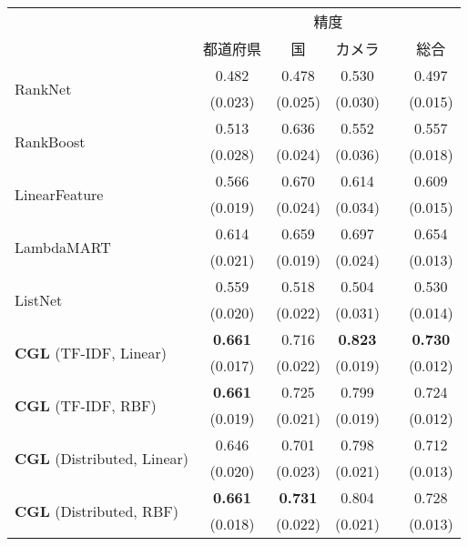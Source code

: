 \begin{tabular}{l c c c p{0.1em} c }
\toprule
&\multicolumn{5}{c}{精度}\\
\cmidrule(lr){2-6}
&都道府県&国&カメラ&&総合\\
\midrule
\multirow{2}{*}{RankNet~\cite{burges2005learning}}&0.482 & 0.478 & 0.530 && 0.497 \\ 
& (0.023) & (0.025) & (0.030) && (0.015) \\
\midrule
\multirow{2}{*}{RankBoost~\cite{freund2003efficient}}&0.513 & 0.636 & 0.552 && 0.557 \\
 & (0.028) & (0.024) & (0.036) && (0.018) \\
\midrule
\multirow{2}{*}{LinearFeature~\cite{metzler2007linear}}&0.566 & 0.670 & 0.614 && 0.609 \\
 & (0.019) & (0.024) & (0.034) && (0.015) \\
\midrule
\multirow{2}{*}{LambdaMART~\cite{wu2010adapting}}&0.614 & 0.659 & 0.697 && 0.654 \\
 & (0.021) & (0.019) & (0.024) && (0.013) \\
\midrule
\multirow{2}{*}{ListNet~\cite{cao2007learning}}&0.559 & 0.518 & 0.504 && 0.530 \\
 & (0.020) & (0.022) & (0.031) && (0.014) \\
\midrule
\midrule
\multirow{2}{*}{{\bf CGL} (TF-IDF, Linear)}&{\bf 0.661} & 0.716 & {\bf 0.823} && {\bf 0.730} \\
 & (0.017) & (0.022) & (0.019) && (0.012) \\
\midrule
\multirow{2}{*}{{\bf CGL} (TF-IDF, RBF)}&{\bf 0.661} & 0.725 & 0.799 && 0.724 \\
 & (0.019) & (0.021) & (0.019) && (0.012) \\
\midrule
\multirow{2}{*}{{\bf CGL} (Distributed, Linear)}& 0.646 & 0.701 & 0.798 && 0.712 \\
 & (0.020) & (0.023) & (0.021) && (0.013) \\
\midrule
\multirow{2}{*}{{\bf CGL} (Distributed, RBF)}&{\bf 0.661} & {\bf 0.731} & 0.804 && 0.728 \\
 & (0.018) & (0.022) & (0.021) && (0.013) \\
\bottomrule
\end{tabular}
